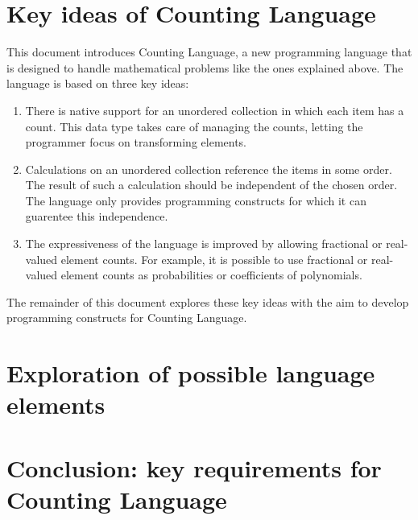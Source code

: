 \documentclass{article}
\begin{document}
\section{Key ideas of Counting Language}

This document introduces Counting Language, a new programming language that is designed to handle mathematical problems like the ones explained above. The language is based on three key ideas:
\begin{enumerate}
\item There is native support for an unordered collection in which each item has a count. This data type takes care of managing the counts, letting the programmer focus on transforming elements.
\item Calculations on an unordered collection reference the items in some order. The result of such a calculation should be independent of the chosen order. The language only provides programming constructs for which it can guarentee this independence.
\item The expressiveness of the language is improved by allowing fractional or real-valued element counts. For example, it is possible to use fractional or real-valued element counts as probabilities or coefficients of polynomials.
\end{enumerate}

The remainder of this document explores these key ideas with the aim to develop programming constructs for Counting Language.

\section{Exploration of possible language elements}

\section{Conclusion: key requirements for Counting Language}
\end{document}
